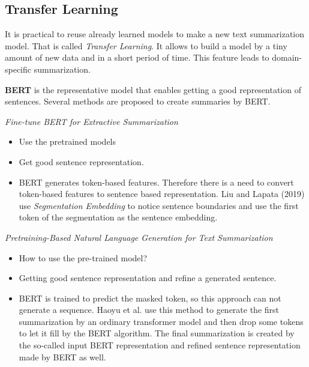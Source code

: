 \subsection{Transfer Learning}\label{ss:neuralgen2}

It is practical to reuse already learned models to make a new text summarization model. That is called \textit{Transfer Learning}. It allows to build a model by a tiny amount of new data and in a short period of time. This feature leads to domain-specific summarization.

\textbf{BERT} is the representative model that enables getting a good representation of sentences. Several methods are proposed to create summaries by BERT.

\textit{Fine-tune BERT for Extractive Summarization}

\begin{itemize}
	\item Use the pretrained models
	\item Get good sentence representation.
	\item BERT generates token-based features. Therefore there is a need to convert token-based features to sentence based representation. Liu and Lapata (2019) \cite{liu-lapata-2019-text} use \textit{Segmentation Embedding} to notice sentence boundaries and use the first token of the segmentation as the sentence embedding.
\end{itemize}

\textit{Pretraining-Based Natural Language Generation for Text Summarization}

\begin{itemize}
	\item How to use the pre-trained model?
	\item Getting good sentence representation and refine a generated sentence.
	\item BERT is trained to predict the masked token, so this approach can not generate a sequence. Haoyu et al. \cite{bert} use this method to generate the first summarization by an ordinary transformer model and then drop some tokens to let it fill by the BERT algorithm. The final summarization is created by the so-called input BERT representation and refined sentence representation made by BERT as well.
\end{itemize}
